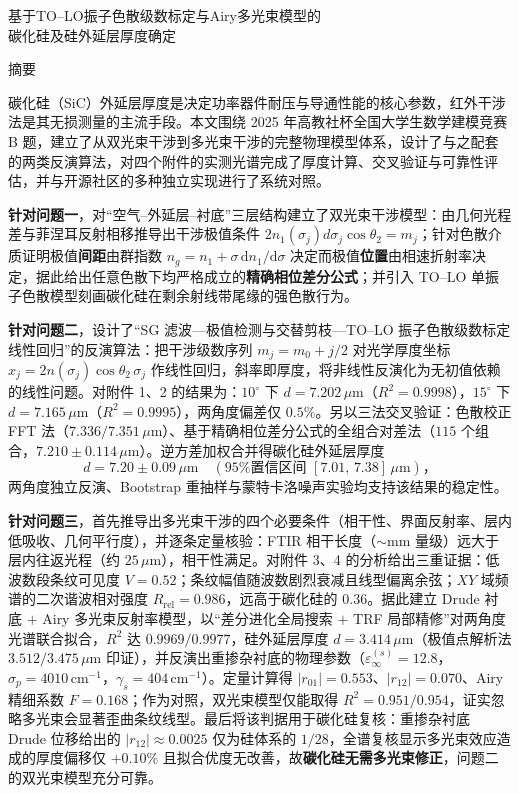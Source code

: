 \documentclass[11pt,a4paper,fontset=fandol]{ctexart}
\newcommand{\um}{\,\mu\mathrm{m}}
\newcommand{\invcm}{\,\mathrm{cm^{-1}}}
\begin{document}
\begin{center}
    {\heiti 基于TO--LO振子色散级数标定与Airy多光束模型的\\[0.2em]碳化硅及硅外延层厚度确定}
\end{center}

\begin{center}
    {\heiti 摘\quad 要}
\end{center}

碳化硅（SiC）外延层厚度是决定功率器件耐压与导通性能的核心参数，红外干涉法是其无损测量的主流手段。本文围绕 2025 年高教社杯全国大学生数学建模竞赛 B 题，建立了从双光束干涉到多光束干涉的完整物理模型体系，设计了与之配套的两类反演算法，对四个附件的实测光谱完成了厚度计算、交叉验证与可靠性评估，并与开源社区的多种独立实现进行了系统对照。

\textbf{针对问题一}，对``空气--外延层--衬底''三层结构建立了双光束干涉模型：由几何光程差与菲涅耳反射相移推导出干涉极值条件 $2n_1(\sigma_j)d\sigma_j\cos\theta_2=m_j$；针对色散介质证明极值\textbf{间距}由群指数 $n_g=n_1+\sigma\,\mathrm{d}n_1/\mathrm{d}\sigma$ 决定而极值\textbf{位置}由相速折射率决定，据此给出任意色散下均严格成立的\textbf{精确相位差分公式}；并引入 TO--LO 单振子色散模型刻画碳化硅在剩余射线带尾缘的强色散行为。

\textbf{针对问题二}，设计了``SG 滤波---极值检测与交替剪枝---TO--LO 振子色散级数标定线性回归''的反演算法：把干涉级数序列 $m_j=m_0+j/2$ 对光学厚度坐标 $x_j=2n(\sigma_j)\cos\theta_2\,\sigma_j$ 作线性回归，斜率即厚度，将非线性反演化为无初值依赖的线性问题。对附件 1、2 的结果为：$10^\circ$ 下 $d=7.202\um$（$R^2=0.9998$），$15^\circ$ 下 $d=7.165\um$（$R^2=0.9995$），两角度偏差仅 $0.5\%$。另以三法交叉验证：色散校正 FFT 法（$7.336/7.351\um$）、基于精确相位差分公式的全组合对差法（$115$ 个组合，$7.210\pm0.114\um$）。逆方差加权合并得碳化硅外延层厚度
$$d = 7.20\pm0.09\um\quad(\text{95\% 置信区间 } [7.01,\,7.38]\um)\text{，}$$
两角度独立反演、Bootstrap 重抽样与蒙特卡洛噪声实验均支持该结果的稳定性。

\textbf{针对问题三}，首先推导出多光束干涉的四个必要条件（相干性、界面反射率、层内低吸收、几何平行度），并逐条定量核验：FTIR 相干长度（$\sim$mm 量级）远大于层内往返光程（约 $25\um$），相干性满足。对附件 3、4 的分析给出三重证据：低波数段条纹可见度 $V=0.52$；条纹幅值随波数剧烈衰减且线型偏离余弦；$XY$ 域频谱的二次谐波相对强度 $R_{\mathrm{rel}}=0.986$，远高于碳化硅的 $0.36$。据此建立 Drude 衬底 $+$ Airy 多光束反射率模型，以``差分进化全局搜索 $+$ TRF 局部精修''对两角度光谱联合拟合，$R^2$ 达 $0.9969/0.9977$，硅外延层厚度 $d=3.414\um$（极值点解析法 $3.512/3.475\um$ 印证），并反演出重掺杂衬底的物理参数（$\varepsilon_\infty^{(s)}=12.8$，$\sigma_p=4010\invcm$，$\gamma_s=404\invcm$）。定量计算得 $|r_{01}|=0.553$、$|r_{12}|=0.070$、Airy 精细系数 $F=0.168$；作为对照，双光束模型仅能取得 $R^2=0.951/0.954$，证实忽略多光束会显著歪曲条纹线型。最后将该判据用于碳化硅复核：重掺杂衬底 Drude 位移给出的 $|r_{12}|\approx0.0025$ 仅为硅体系的 $1/28$，全谱复核显示多光束效应造成的厚度偏移仅 $+0.10\%$ 且拟合优度无改善，故\textbf{碳化硅无需多光束修正}，问题二的双光束模型充分可靠。
\end{document}
